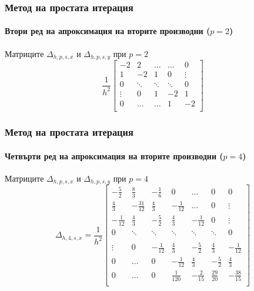 \documentclass{beamer}
\begin{document}
\begin{frame}
\frametitle{Метод на простата итерация}
\framesubtitle{Втори ред на апроксимация на вторите производни ($p=2$)}
Матриците $\Delta_{h,p,s,x}$ и $\Delta_{h,p,s,y}$ при $p=2$
\[
\frac{1}{h^2}
\begin{bmatrix}
    -2	       & 2        &     \dots   &   \dots        & 0   \\
    1               & -2            &   1           &   0               & \vdots    \\
        0           & \ddots        &    \ddots    &   \ddots       &  0 \\ 
    \vdots       &     0            &  1     	& -2    	   & 1 \\
    0               & \dots          &  \dots         & 1  	   & -2 \\
\end{bmatrix}
\]
\end{frame}

\begin{frame}
\frametitle{Метод на простата итерация}
\framesubtitle{Четвърти ред на апроксимация на вторите производни ($p=4$)}
Матриците $\Delta_{h,p,s,x}$ и $\Delta_{h,p,s,y}$ при $p=4$
\[
\Delta_{h,4,s,x} = \frac{1}{h^2}
\begin{bmatrix}
     -\frac{5}{2}	& \frac{8}{3}       & -\frac{1}{6}	&    0     			&    \dots      	   &   0           & 0    \\
    \frac{4}{3}          &-\frac{31}{12}    	& \frac{4}{3}	&   -\frac{1}{12}	  	&   \dots      	  &   0	           & \vdots  \\
    -\frac{1}{12}	& \frac{4}{3}         	& -\frac{5}{2}	&  \frac{4}{3}    	 &   -\frac{1}{12}	  &      0           &\vdots    \\
        0           		& \ddots        	&    \ddots   		 &   \ddots      	 &     \ddots      	  &  \ddots        &    0 \\	
\\
   \vdots      		 & 0           		 &  -\frac{1}{12}	& \frac{4}{3}    	& -\frac{5}{2}	&  \frac{4}{3}   &   -\frac{1}{12} \\
    0      		 &  \dots           	 &   0     		& -\frac{1}{12} 	 & \frac{4}{3} 	 & -\frac{5}{2}  &  \frac{4}{3}\\
    0              		 & \dots          	&  0              		 &\frac{1}{120} 	 &  -\frac{2}{15} 	& \frac{29}{20} & -\frac{38}{15}\\
\end{bmatrix}
\]
\end{frame}
\end{document}

